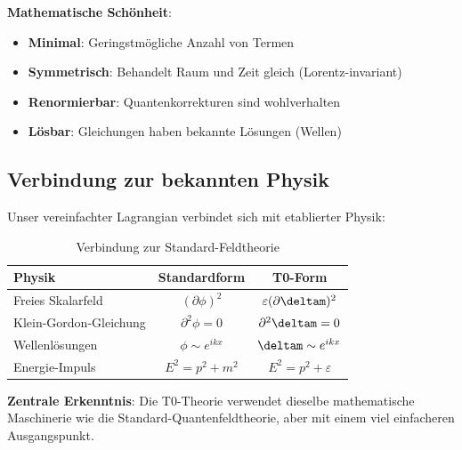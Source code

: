 	\textbf{Mathematische Schönheit}:
	\begin{itemize}
		\item \textbf{Minimal}: Geringstmögliche Anzahl von Termen
		\item \textbf{Symmetrisch}: Behandelt Raum und Zeit gleich (Lorentz-invariant)
		\item \textbf{Renormierbar}: Quantenkorrekturen sind wohlverhalten
		\item \textbf{Lösbar}: Gleichungen haben bekannte Lösungen (Wellen)
	\end{itemize}
	
	\subsection{Verbindung zur bekannten Physik}
	
	Unser vereinfachter Lagrangian verbindet sich mit etablierter Physik:
	
	\begin{table}[htbp]
		\centering
		\begin{tabular}{lcc}
			\toprule
			\textbf{Physik} & \textbf{Standardform} & \textbf{T0-Form} \\
			\midrule
			Freies Skalarfeld & $(\partial \phi)^2$ & $\varepsilon(\partial \deltam)^2$ \\
			Klein-Gordon-Gleichung & $\partial^2 \phi = 0$ & $\partial^2 \deltam = 0$ \\
			Wellenlösungen & $\phi \sim e^{ikx}$ & $\deltam \sim e^{ikx}$ \\
			Energie-Impuls & $E^2 = p^2 + m^2$ & $E^2 = p^2 + \varepsilon$ \\
			\bottomrule
		\end{tabular}
		\caption{Verbindung zur Standard-Feldtheorie}
		\label{tab:standard_connection}
	\end{table}
	
	\textbf{Zentrale Erkenntnis}: Die T0-Theorie verwendet dieselbe mathematische Maschinerie wie die Standard-Quantenfeldtheorie, aber mit einem viel einfacheren Ausgangspunkt.

